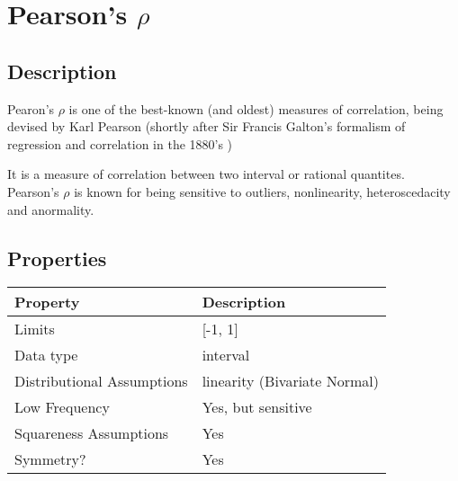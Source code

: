 \documentclass[11pt]{article}
\begin{document}
\section{Pearson's $\rho$} %
\label{section:pearsonrho}
\subsection{Description}
Pearon's $\rho$ is one of the best-known (and oldest) measures of correlation, being devised by Karl Pearson (shortly after Sir Francis Galton's formalism of regression and correlation in the 1880's \cite{galton1888co}) %

It is a measure of correlation between two interval or rational quantites.  Pearson's $\rho$ is known for being sensitive to outliers, nonlinearity, heteroscedacity and anormality.


\subsection{Properties}
\begin{tabular}{| l || l |}
    \hline
    {\bf Property} & {\bf Description} \\
    \hline
    Limits & [-1, 1] \\ \hline

    Data type & interval \\ \hline

    Distributional Assumptions & linearity (Bivariate Normal) \\ \hline

    Low Frequency & Yes, but sensitive \\ \hline

    Squareness Assumptions & Yes \\ \hline

    Symmetry? & Yes \\ \hline

\end{tabular}
\end{document}
